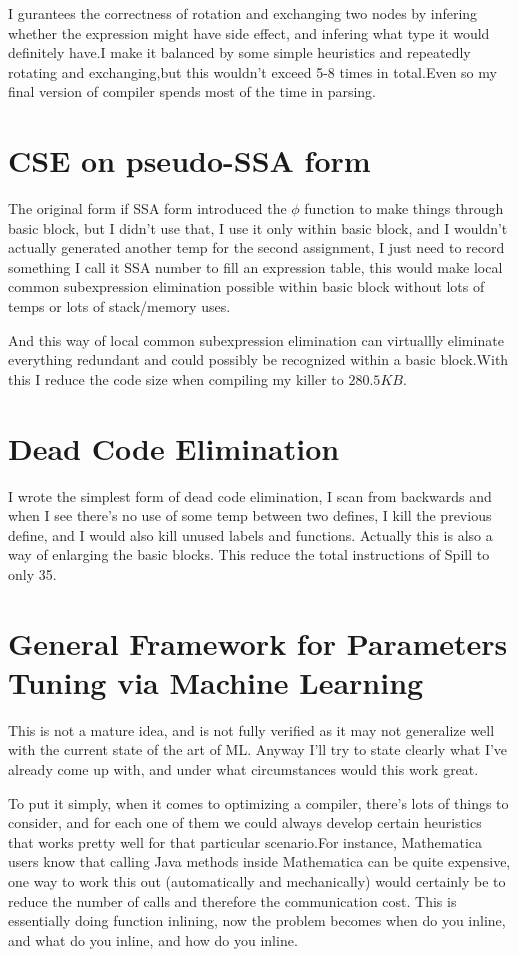 \documentclass[a4paper]{article}
\begin{document}
I gurantees the correctness of rotation and exchanging two nodes by infering whether the expression might have side effect,
and infering what type it would definitely have.I make it balanced by some simple heuristics and repeatedly rotating and
exchanging,but this wouldn't exceed 5-8 times in total.Even so my final version of compiler spends most of the time in parsing.
\section{CSE on pseudo-SSA form}
The original form if SSA form introduced the $\phi$ function to make things through basic block, but I didn't use that,
I use it only within basic block, and I wouldn't actually generated another temp for the second assignment, I just need
to record something I call it SSA number to fill an expression table, this would make local common subexpression elimination
possible within basic block without lots of temps or lots of stack/memory uses.

And this way of local common subexpression elimination can virtuallly eliminate everything redundant and could possibly be recognized
within a basic block.With this I reduce the code size when compiling my killer to $280.5KB$.
\section{Dead Code Elimination}
I wrote the simplest form of dead code elimination, I scan from backwards and when I see there's no use of some
temp between two defines, I kill the previous define, and I would also kill unused labels and functions.
Actually this is also a way of enlarging the basic blocks.
This reduce the total instructions of Spill to only 35.

\section{General Framework for Parameters Tuning via Machine Learning}
This is not a mature idea, and is not fully verified as it may not generalize well 
with the current state of the art of ML.
Anyway I'll try to state clearly what I've already come up with, and under what circumstances
would this work great.

To put it simply, when it comes to optimizing a compiler,
there's lots of things to consider, and for each one of them
we could always develop certain heuristics that works pretty
well for that particular scenario.For instance, Mathematica
users know that calling Java methods inside Mathematica 
can be quite expensive, one way to work this out (automatically and mechanically) would certainly
be to reduce the number of calls and therefore the communication cost.
This is essentially doing function inlining, now the problem becomes
when do you inline, and what do you inline, and how do you inline.
\end{document}
